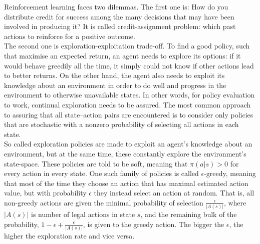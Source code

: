 Reinforcement learning faces two dilemmas. The first one is: How do you distribute credit for success among the many decisions that may have been involved in producing it? It is called credit-assignment problem: which past actions to reinforce for a positive outcome. \\
The second one is exploration-exploitation trade-off. To find a good policy, such that maximise an expected return, an agent needs to explore its options: if it would behave greedily all the time, it simply could not know if other actions lead to better returns. On the other hand, the agent also needs to exploit its knowledge about an environment in order to do well and progress in the environment to otherwise unavailable states. In other words, for policy evaluation to work, continual exploration needs to be assured. The most common approach to assuring that all state–action pairs are encountered is to consider only policies that are stochastic with a nonzero probability of selecting all actions in each state. \\
So called exploration policies are made to exploit an agent's knowledge about an environment, but at the same time, these constantly explore the environment's state-space. These policies are told to be soft, meaning that $\pi(a|s) > 0$ for every action in every state. One such family of policies is called $\epsilon$-greedy, meaning that most of the time they choose an action that has maximal estimated action value, but with probability $\epsilon$ they instead select an action at random. That is, all non-greedy actions are given the minimal probability of selection $\frac{\epsilon}{|A(s)|}$, where $|A(s)|$ is number of legal actions in state $s$, and the remaining bulk of the probability, $1 - \epsilon + \frac{\epsilon}{|A(s)|}$, is given to the greedy action. The bigger the $\epsilon$, the higher the exploration rate and vice versa.

